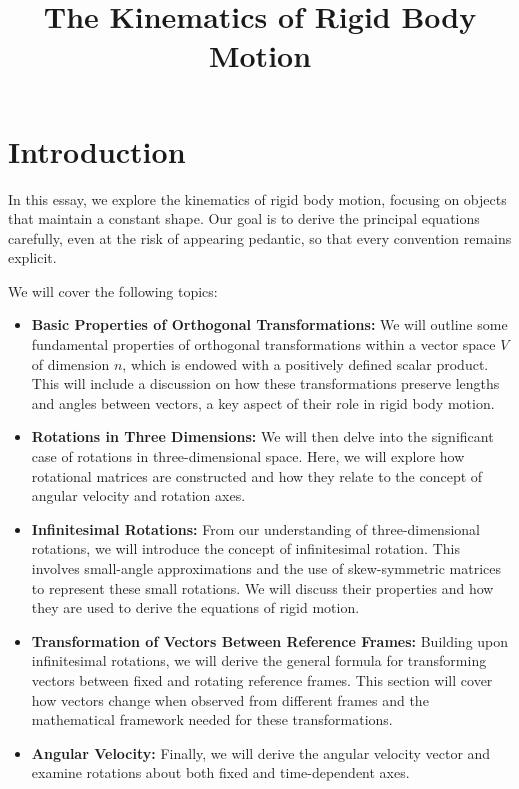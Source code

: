 \documentclass[12pt]{article}
\title{The Kinematics of Rigid Body Motion}
\author{}
\date{}
\begin{document}
\maketitle
 

\section{Introduction}

In this essay, we explore the kinematics of rigid body motion, focusing on objects that
maintain a constant shape. Our goal is to derive the principal equations carefully, even at
the risk of appearing pedantic, so that every convention remains explicit.

We will cover the following topics:

\begin{itemize}
  \item \textbf{Basic Properties of Orthogonal Transformations:} We will outline some
        fundamental properties of orthogonal transformations within a vector space $V$ of
        dimension $n$, which is endowed with a positively defined scalar product. This will
        include a discussion on how these transformations preserve lengths and angles between
        vectors, a key aspect of their role in rigid body motion.
  \item \textbf{Rotations in Three Dimensions:} We will then delve into the significant case
        of rotations in three-dimensional space. Here, we will explore how rotational matrices
        are constructed and how they relate to the concept of angular velocity and rotation
        axes.
  \item \textbf{Infinitesimal Rotations:} From our understanding of three-dimensional
        rotations, we will introduce the concept of infinitesimal rotation. This involves
        small-angle approximations and the use of skew-symmetric matrices to represent these
        small rotations. We will discuss their properties and how they are used to derive the
        equations of rigid motion.
  \item \textbf{Transformation of Vectors Between Reference Frames:} Building upon
        infinitesimal rotations, we will derive the general formula for transforming vectors
        between fixed and rotating reference frames. This section will cover how vectors
        change when observed from different frames and the mathematical framework needed for
        these transformations.
  \item \textbf{Angular Velocity:} Finally, we will derive the angular velocity vector and
        examine rotations about both fixed and time-dependent axes.
\end{itemize}
\end{document}

